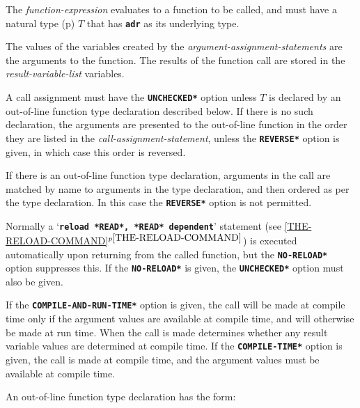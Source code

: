 \documentclass[12pt]{article}
\makeatletter
\newcommand{\TT}[1]{{\tt \bfseries #1}}
\newcommand{\ttakey}[1]{\TT{*#1*}\index{#1@{\tt *#1*}}}
\newcommand{\itemref}[1]{\ref{#1}$^{p\pageref{#1}}$}
\newcommand{\pagref}[1]{p\pageref{#1}}
\makeatother
\begin{document}
The {\em function-expression} evaluates to a function to be called,
and must have a natural type (\pagref{NATURAL-TYPE})
$T$ that has \TT{adr} as its underlying type.

The values of the variables created by the {\em argument-assignment-statements}
are the arguments to the function.
The results of the function call are stored in the
{\em result-variable-list} variables.

A call assignment must have the \TT{*UNCHECKED*} option
unless $T$ is declared by an out-of-line
function type declaration described below.  If there is no
such declaration, the arguments are presented to the out-of-line
function in the order they are listed in the {\em call-assignment-statement},
unless the \TT{*REVERSE*} option is given, in which case this order
is reversed.

If there is an out-of-line function type declaration, arguments in the
call are matched by name to arguments in the type declaration,
and then ordered as per the type declaration.  In this case
the \TT{*REVERSE*} option is not permitted.

Normally a `\TT{reload *READ*, *READ* dependent}'
statement (see \itemref{THE-RELOAD-COMMAND})
is executed automatically
upon returning from the called function, but the
\ttakey{NO-RELOAD} option suppresses this.
If the \TT{*NO-RELOAD*} is given, the \TT{*UNCHECKED*} option must
also be given.

If the \TT{*COMPILE-AND-RUN-TIME*} option is given, the call
will be made at compile time only if the argument values are available
at compile time, and will otherwise be made at run time.  When the call
is made determines whether any result variable values are determined
at compile time.  If the \TT{*COMPILE-TIME*} option is given,
the call is made at compile time, and the argument values must be
available at compile time.

An out-of-line function type declaration has the form:
\end{document}
